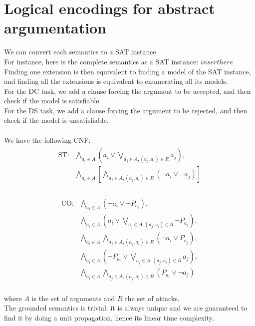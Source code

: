 \documentclass[11pt]{article}
\begin{document}
\section{Logical encodings for abstract argumentation}
We can convert each semantics to a SAT instance. \\
For instance, here is the complete semantics as a SAT instance:
$
insert here
$
Finding one extension is then equivalent to finding a model of the SAT instance, and finding all the extensions is equivalent to enumerating all its models. \\
For the DC task, we add a clause forcing the argument to be accepted, and then check if the model is satisfiable. \\
For the DS task, we add a clause forcing the argument to be rejected, and then check if the model is unsatisfiable. \\ \\
We have the following CNF: \\
\begin{align}
\begin{split}
\text{ST}: &\bigwedge_{a_i\in A}\left(a_i \lor \bigvee_{a_j\in A, (a_j, a_i)\in R}a_j\right), \\
&\bigwedge_{a_i\in A}\left[\bigwedge_{a_j\in A, (a_j, a_i)\in R}\left(\lnot a_i \lor \lnot a_j\right)\right]
\end{split}
\end{align} \\
\begin{align}
\begin{split}
\text{CO}: &\bigwedge_{a_i\in A}\left(\lnot a_i \lor \lnot P_{a_i}\right), \\
&\bigwedge_{a_i\in A}\left(a_i \lor \bigvee_{a_j\in A, (a_j, a_i)\in R}\lnot P_{a_j}\right), \\
&\bigwedge_{a_i\in A}\bigwedge_{a_j\in A, (a_j, a_i)\in R}\left(\lnot a_i \lor P_{a_j}\right), \\
&\bigwedge_{a_i\in A}\left(\lnot P_{a_i} \lor \bigvee_{a_j\in A, (a_j, a_i)\in R}a_j\right), \\
&\bigwedge_{a_i\in A}\bigwedge_{a_j\in A, (a_j, a_i)\in R}\left(P_{a_i} \lor \lnot a_j\right)
\end{split}
\end{align} \\
where $A$ is the set of arguments and $R$ the set of attacks\cite{lagniez2015coquiaas}. \\
The grounded semantics is trivial: it is always unique and we are guaranteed to find it by doing a unit propagation, hence its linear time complexity. \\
\end{document}
